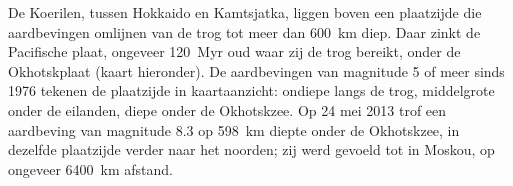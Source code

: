 De Koerilen, tussen Hokkaido en Kamtsjatka, liggen boven een plaatzijde die aardbevingen omlijnen van de trog tot meer dan \qty{600}{km} diep. Daar zinkt de Pacifische plaat, ongeveer \qty{120}{Myr} oud waar zij de trog bereikt, onder de Okhotskplaat (kaart hieronder). De aardbevingen van magnitude 5 of meer sinds 1976 tekenen de plaatzijde in kaartaanzicht: ondiepe langs de trog, middelgrote onder de eilanden, diepe onder de Okhotskzee. Op 24 mei 2013 trof een aardbeving van magnitude 8.3 op \qty{598}{km} diepte onder de Okhotskzee, in dezelfde plaatzijde verder naar het noorden; zij werd gevoeld tot in Moskou, op ongeveer \qty{6400}{km} afstand.

